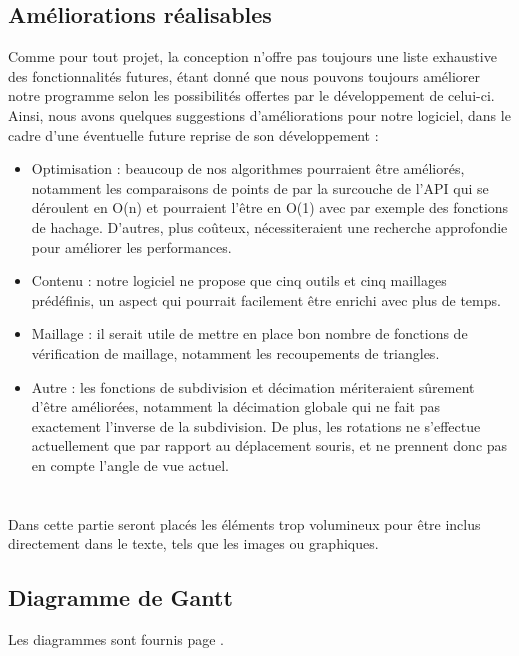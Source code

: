 \documentclass[a4paper]{memoir}
\begin{document}
		\section{Améliorations réalisables}
			Comme pour tout projet, la conception n'offre pas toujours une liste exhaustive des fonctionnalités futures, étant donné que nous pouvons 
			toujours améliorer notre programme selon les possibilités offertes par le développement de celui-ci. Ainsi, nous avons quelques suggestions 
			d'améliorations pour notre logiciel, dans le cadre d'une éventuelle future reprise de son développement :
			\begin{itemize}
				\item Optimisation : beaucoup de nos algorithmes pourraient être améliorés, notamment les comparaisons de points de par la surcouche de 
				l'API qui se déroulent en O(n) et pourraient l'être en O(1) avec par exemple des fonctions de hachage. D'autres, plus coûteux, 
				nécessiteraient une recherche approfondie pour améliorer les performances.
				\item Contenu : notre logiciel ne propose que cinq outils et cinq maillages prédéfinis, un aspect qui pourrait facilement être enrichi 
				avec plus de temps.
				\item Maillage : il serait utile de mettre en place bon nombre de fonctions de vérification de maillage, notamment les recoupements de 
				triangles.
				\item Autre : les fonctions de subdivision et décimation mériteraient sûrement d'être améliorées, notamment la décimation globale qui ne
				fait pas exactement l'inverse de la subdivision. De plus, les rotations ne s'effectue actuellement que par rapport au déplacement souris,
				et ne prennent donc pas en compte l'angle de vue actuel.
			\end{itemize}

	\appendix
	\chapter{}
		Dans cette partie seront placés les éléments trop volumineux pour être inclus directement dans le texte, tels que les images ou graphiques.\\
		
		\section{Diagramme de Gantt}
			Les diagrammes sont fournis page \pageref{fig:gantt}.
			
\end{document}
